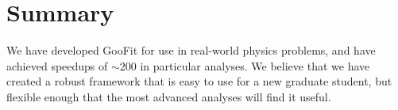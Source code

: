 \section{Summary}
\label{sec:summary}

We have developed GooFit for use in real-world physics problems, 
and have achieved speedups of $\sim 200$ in particular analyses. 
We believe that we have created a robust framework that is easy
to use for a new graduate student, but flexible enough that the
most advanced analyses will find it useful. 
